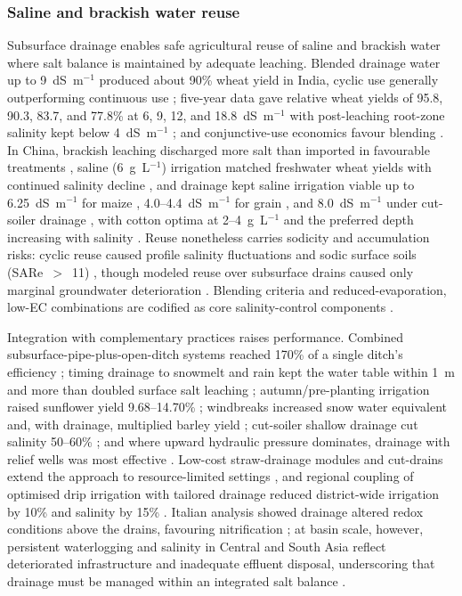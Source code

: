 \documentclass[11pt]{article}
\begin{document}
\subsubsection{Saline and brackish water reuse}

Subsurface drainage enables safe agricultural reuse of saline and brackish water
where salt balance is maintained by adequate leaching. Blended drainage water up
to 9~dS~m$^{-1}$ produced about 90\% wheat yield in India, cyclic use generally
outperforming continuous use \parencite{Sharma2004}; five-year data gave relative
wheat yields of 95.8, 90.3, 83.7, and 77.8\% at 6, 9, 12, and 18.8~dS~m$^{-1}$
with post-leaching root-zone salinity kept below 4~dS~m$^{-1}$
\parencite{Sharma1998}; and conjunctive-use economics favour blending
\parencite{AGNIHOTRI1992}. In China, brackish leaching discharged more salt than
imported in favourable treatments \parencite{Li2023}, saline (6~g~L$^{-1}$)
irrigation matched freshwater wheat yields with continued salinity decline
\parencite{Gao2023}, and drainage kept saline irrigation viable up to
6.25~dS~m$^{-1}$ for maize \parencite{Feng2017}, 4.0--4.4~dS~m$^{-1}$ for grain
\parencite{Feng2021}, and 8.0~dS~m$^{-1}$ under cut-soiler drainage
\parencite{Neha2022}, with cotton optima at 2--4~g~L$^{-1}$ and the preferred
depth increasing with salinity \parencite{Li2024,Lu2019}. Reuse nonetheless
carries sodicity and accumulation risks: cyclic reuse caused profile salinity
fluctuations and sodic surface soils (SARe~$>$~11)
\parencite{Mitchell2000,Jayawardane2001}, though modeled reuse over subsurface
drains caused only marginal groundwater deterioration \parencite{KARAJEH1994c}.
Blending criteria and reduced-evaporation, low-EC combinations are codified as
core salinity-control components \parencite{Kotb2000,Cuevas2019}.

Integration with complementary practices raises performance. Combined
subsurface-pipe-plus-open-ditch systems reached 170\% of a single ditch's
efficiency \parencite{Yao2024}; timing drainage to snowmelt and rain kept the
water table within 1~m and more than doubled surface salt leaching
\parencite{Yu2016}; autumn/pre-planting irrigation raised sunflower yield
9.68--14.70\% \parencite{Liu2023,Liu2025c}; windbreaks increased snow water
equivalent and, with drainage, multiplied barley yield
\parencite{Steppuhn2006,Steppuhn2017}; cut-soiler shallow drainage cut salinity
50--60\% \parencite{Neha2022,Neha2022b}; and where upward hydraulic pressure
dominates, drainage with relief wells was most effective
\parencite{Benyamini2005,Mirlas2003}. Low-cost straw-drainage modules and
cut-drains extend the approach to resource-limited settings
\parencite{Lu2019,Okuda2020}, and regional coupling of optimised drip irrigation
with tailored drainage reduced district-wide irrigation by 10\% and salinity by
15\% \parencite{Liu2026}. Italian analysis showed drainage altered redox
conditions above the drains, favouring nitrification \parencite{Mastrocicco2013};
at basin scale, however, persistent waterlogging and salinity in Central and
South Asia reflect deteriorated infrastructure and inadequate effluent disposal,
underscoring that drainage must be managed within an integrated salt balance
\parencite{Dukhovny2007,Qureshi2008,Ritzema2016,SKAGGS1994}.
\end{document}
